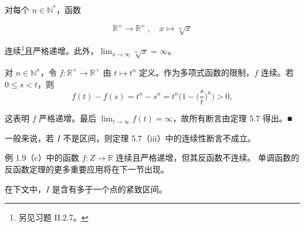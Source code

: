 \begin{example}

\begin{items}
\item

对每个 $ n \in \mathbb{N}^* $，函数

\[
\mathbb{R}^{+}\to\mathbb{R}^{+}\ ,\quad x\mapsto\sqrt[n]{x}
\]

连续\footnote{另见习题 II.2.7。}且严格递增。此外，$ \lim_{x \to \infty} \sqrt[n]{x} = \infty $。

\proofhead
对 $ n \in \mathbb{N}^x $，令 $ f: \mathbb{R}^+ \to \mathbb{R}^+ $ 由 $ t \mapsto t^n $ 定义。作为多项式函数的限制，$ f $ 连续。若 $ 0 \leq s < t $，则
\[
f(t)-f(s)=t^{n}-s^{n}=t^{n}\Big(1-\Big(\frac{s}{t}\Big)^{n}\Big)>0,
\]

这表明 $f$ 严格递增。最后 $\lim_{t \to \infty} f(t) = \infty$，故所有断言由定理 5.7 得出。■

\item

一般来说，若 $ I $ 不是区间，则定理 5.7（iii）中的连续性断言不成立。

\proofhead
例 1.9（c）中的函数 $ f: Z \to \mathbb{R} $ 连续且严格递增，但其反函数不连续。
单调函数的反函数定理的更多重要应用将在下一节出现。
\end{items}

\end{example}

\exerciseshead

在下文中，$ I $ 是含有多于一个点的紧致区间。

